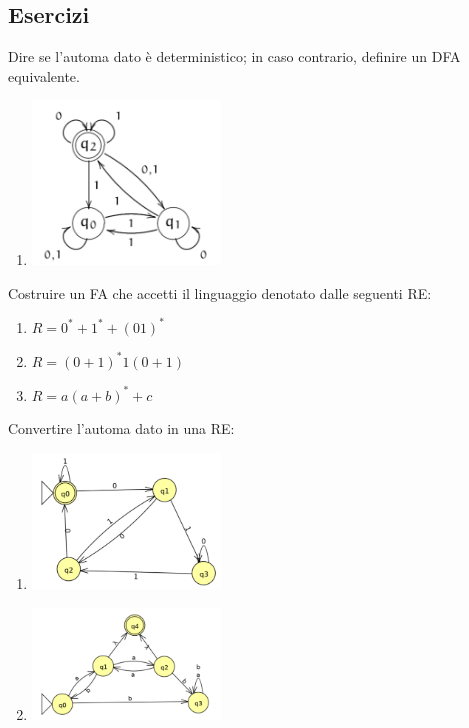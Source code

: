 \documentclass[a4paper,11pt]{article}
\begin{document}
\subsection{Esercizi}
    Dire se l'automa dato è deterministico; in caso contrario, definire un DFA equivalente.
    \begin{enumerate}
        \item \begin{minipage}{\linewidth}
            \centering
            \includegraphics[width=5cm]{Fig1.png}
        \end{minipage}
    \end{enumerate}
    Costruire un FA che accetti il linguaggio denotato dalle seguenti RE:
    \begin{enumerate}
    \item $R=0^* + 1^* + (01)^*$
    \item $R=(0+1)^*1(0+1)$
    \item $R=a(a+b)^*+c$
    \end{enumerate}
    Convertire l'automa dato in una RE:
    \begin{enumerate}
        \item \begin{minipage}{\linewidth}
            \centering
            \includegraphics[width=5cm]{Lez2dfatore1.png}
        \end{minipage}
        \item \begin{minipage}{\linewidth}
                \centering
                \includegraphics[width=5cm]{Lez3fatore1.png}
        \end{minipage}
    \end{enumerate}
\end{document}
